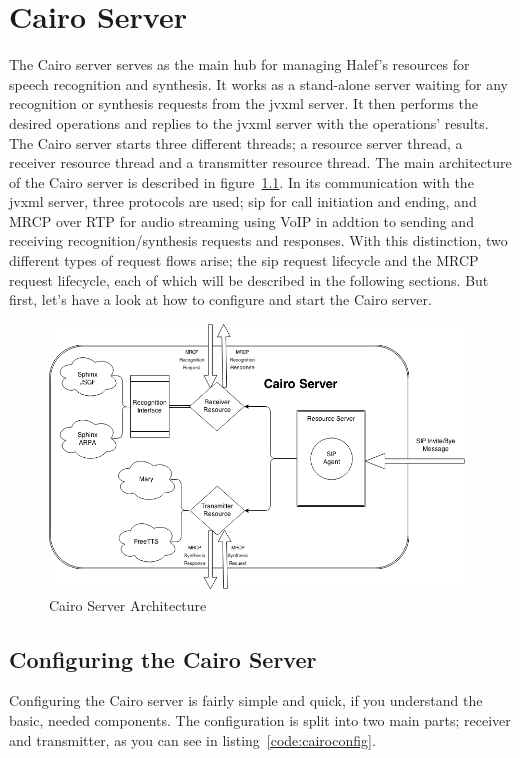 \chapter{Cairo Server}\label{chap:cairo}
The Cairo server serves as the main hub for managing Halef's resources for speech recognition and synthesis.
It works as a stand-alone server waiting for any recognition or synthesis requests from the \ac{jvxml} server. It then performs the desired operations and replies to the \ac{jvxml} server with the operations' results.
The Cairo server starts three different threads; a resource server thread, a receiver resource thread and a transmitter resource thread.
The main architecture of the Cairo server is described in figure~\ref{fig:cairoserver}.
In its communication with the \ac{jvxml} server, three protocols are used; \ac{sip} for call initiation and ending, and MRCP over RTP for audio streaming using VoIP in addtion to sending and receiving recognition/synthesis requests and responses.
With this distinction, two different types of request flows arise; the \ac{sip} request lifecycle and the MRCP request lifecycle, each of which will be described in the following sections.
But first, let's have a look at how to configure and start the Cairo server.
\begin{figure}[h]
  \centering
  \includegraphics[width=11cm]{resources/images/Cairo-Server.png}
  \caption{Cairo Server Architecture}
  \label{fig:cairoserver}
\end{figure}

\section{Configuring the Cairo Server}
Configuring the Cairo server is fairly simple and quick, if you understand the basic, needed components.
The configuration is split into two main parts; receiver and transmitter, as you can see in listing~\ref{code:cairoconfig}.


